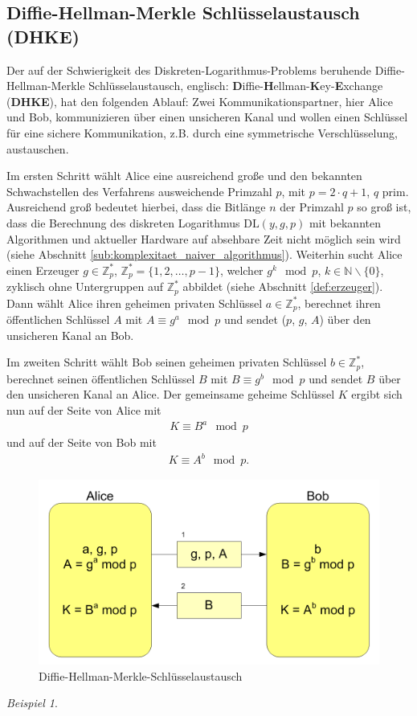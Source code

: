 \documentclass[
  a4paper,
  11pt,
]{scrartcl}
\theoremstyle{plain}
\theoremstyle{definition}
\theoremstyle{remark}
\newtheorem{beispiel}{Beispiel}
\newcommand{\N}{\mathbb{N}}
\newcommand{\Z}{\mathbb{Z}}
\begin{document}
\subsection{Diffie-Hellman-Merkle Schlüsselaustausch (DHKE)}
\label{sub:diffie_hellman_key_exchange}

Der auf der Schwierigkeit des Diskreten-Logarithmus-Problems beruhende Diffie-Hellman-Merkle Schlüsselaustausch, englisch: \textbf{D}iffie-\textbf{H}ellman-\textbf{K}ey-\textbf{E}xchange (\textbf{DHKE}), hat den folgenden Ablauf:
Zwei Kommunikationspartner, hier Alice und Bob, kommunizieren über einen unsicheren Kanal und wollen einen Schlüssel für eine sichere Kommunikation, z.B. durch eine symmetrische Verschlüsselung, austauschen.

Im ersten Schritt wählt Alice eine ausreichend große und den bekannten Schwachstellen des Verfahrens ausweichende Primzahl $p$, mit $p = 2 \cdot q + 1$, $q$ prim. Ausreichend groß bedeutet hierbei, dass die Bitlänge $n$ der Primzahl $p$ so groß ist, dass die Berechnung des diskreten Logarithmus $\text{DL}(y,g,p)$ mit bekannten Algorithmen und aktueller Hardware auf absehbare Zeit nicht möglich sein wird (siehe Abschnitt  \ref{sub:komplexitaet_naiver_algorithmus}). Weiterhin sucht Alice einen Erzeuger $g \in \Z_p^*$, $\Z_p^* = \{1, 2, \ldots, p-1\}$, welcher $g^k \mod p$, $k \in \N \backslash \{0\}$, zyklisch ohne Untergruppen auf $\Z_p^*$ abbildet (siehe Abschnitt  \ref{def:erzeuger}). Dann wählt Alice ihren geheimen privaten Schlüssel $a \in \Z_p^*$,  berechnet ihren öffentlichen Schlüssel $A$ mit $A \equiv g^a \mod p$ und sendet ($p$, $g$, $A$) über den unsicheren Kanal an Bob.

Im zweiten Schritt wählt Bob seinen geheimen privaten Schlüssel $b \in \Z_p^*$, berechnet seinen öffentlichen Schlüssel $B$ mit $B \equiv g^b \mod p$ und sendet $B$ über den unsicheren Kanal an Alice.
Der gemeinsame geheime Schlüssel $K$ ergibt sich nun auf der Seite von Alice mit
\begin{align*}
	K \equiv B^a \mod p
\end{align*}
und auf der Seite von Bob mit
\begin{align*}
	K \equiv A^b \mod p \text{.}
\end{align*}

\begin{figure}[!htb]
  \centering
  \includegraphics[width=\textwidth]{Diffie-Hellman-Schluesselaustausch2.png}
  \caption{Diffie-Hellman-Merkle-Schlüsselaustausch}
  \label{fig:dhke}
\end{figure}

\begin{beispiel}

\end{beispiel}
\end{document}
